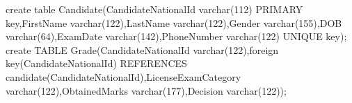 create table Candidate(CandidateNationalId varchar(112) PRIMARY key,FirstName varchar(122),LastName varchar(122),Gender varchar(155),DOB varchar(64),ExamDate varchar(142),PhoneNumber varchar(122) UNIQUE key);
create TABLE Grade(CandidateNationalId varchar(122),foreign key(CandidateNationalId)  REFERENCES candidate(CandidateNationalId),LicenseExamCategory varchar(122),ObtainedMarks varchar(177),Decision varchar(122));